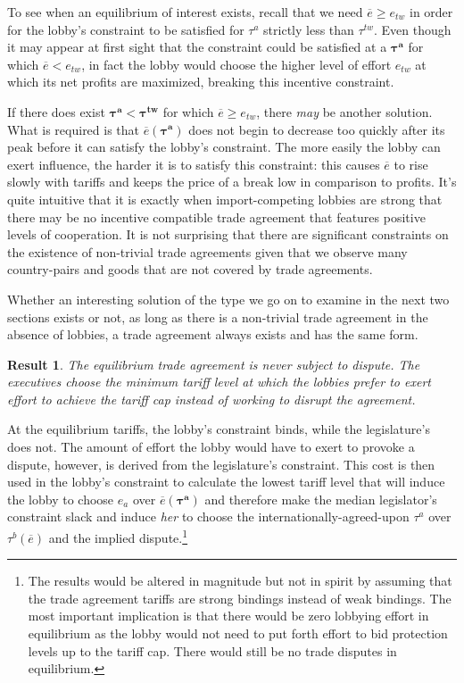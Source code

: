 \documentclass[authoryear, review]{elsarticle}
\newtheorem{result}{Result}
\newcommand{\ov}{\overline}
\newcommand{\bta}{\bm{\tau^a}}
\newcommand{\btw}{\bm{\tau^{tw}}}
\begin{document}
To see when an equilibrium of interest exists, recall that we need $\ov{e} \geq e_{tw}$ in order for the lobby's constraint to be  satisfied for $\tau^a$ strictly less than $\tau^{tw}$. Even though it may appear at first sight that the constraint could be satisfied at a $\bta$ for which $\ov{e} < e_{tw}$, in fact the lobby would choose the higher level of effort $e_{tw}$ at which its net profits are maximized, breaking this incentive constraint. 

If there does exist $\bta < \btw$ for which $\ov{e} \geq e_{tw}$, there \textit{may} be another solution. What is required is that $\ov{e}(\bta)$ does not begin to decrease too quickly after its peak before it can satisfy the lobby's constraint. The more easily the lobby can exert influence, the harder it is to satisfy this constraint: this causes $\ov{e}$ to rise slowly with tariffs and keeps the price of a break low in comparison to profits. It's quite intuitive that it is exactly when import-competing lobbies are strong that there may be no incentive compatible trade agreement that features positive levels of cooperation. It is not surprising that there are significant constraints on the existence of non-trivial trade agreements given that we observe many country-pairs and goods that are not covered by trade agreements.

Whether an interesting solution of the type we go on to examine in the next two sections exists or not, as long as there is a non-trivial trade agreement in the absence of lobbies, a trade agreement always exists and has the same form.				

\begin{result}
  The equilibrium trade agreement is never subject to dispute. The executives choose the minimum tariff level at which the lobbies prefer to exert effort to achieve the tariff cap instead of working to disrupt the agreement.
  \label{res:eqm}
\end{result}
At the equilibrium tariffs, the lobby's constraint binds, while the legislature's does not. The amount of effort the lobby would have to exert to provoke a dispute, however, is derived from the legislature's constraint. This cost is then used in the lobby's constraint to calculate the lowest tariff level that will induce the lobby to choose $e_a$ over $\ov{e}(\bta)$ and therefore make the median legislator's constraint slack and induce \textit{her} to choose the internationally-agreed-upon $\tau^a$ over $\tau^b(\ov{e})$ and the implied dispute.\footnote{The results would be altered in magnitude but not in spirit by assuming that the trade agreement tariffs are strong bindings instead of weak bindings. The most important implication is that there would be zero lobbying effort in equilibrium as the lobby would not need to put forth effort to bid protection levels up to the tariff cap. There would still be no trade disputes in equilibrium.}
\end{document}
